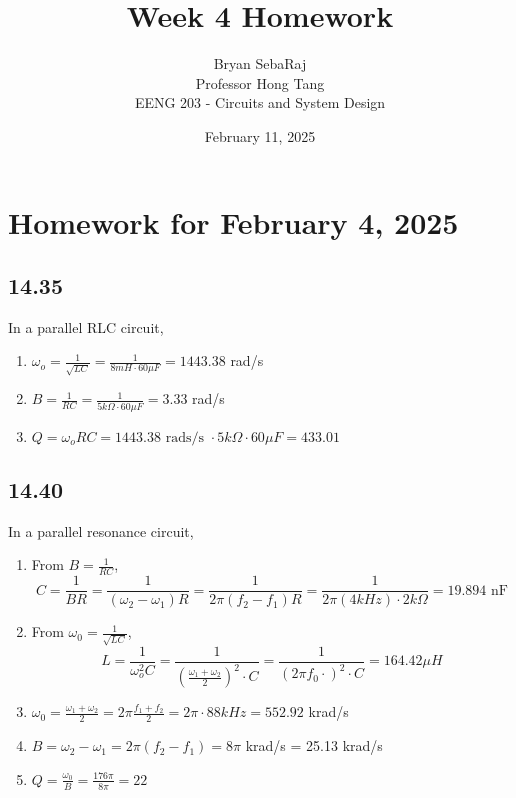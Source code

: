 \documentclass{article}
\title{Week 4 Homework}
\author{Bryan SebaRaj \\[0.7em] Professor Hong Tang \\[0.7em]  EENG 203 - Circuits and System Design}
\date{February 11, 2025}
\begin{document}
\maketitle

\section*{Homework for February 4, 2025}

\subsection*{14.35}

In a parallel RLC circuit,

\begin{enumerate}[label=(\alph*)]
    \item $\omega_o=\frac{1}{\sqrt{LC}}=\frac{1}{8 mH \cdot 60 \mu F}=1443.38$ rad/s
    \item $B=\frac{1}{RC}=\frac{1}{5 k\Omega \cdot 60 \mu F}=3.33$ rad/s
    \item $Q=\omega_oRC=1443.38 \text{ rads/s } \cdot 5 k\Omega \cdot 60 \mu F =  433.01$
\end{enumerate}

\subsection*{14.40}

In a parallel resonance circuit,

\begin{enumerate}[label=(\alph*)]
    \item From $B=\frac{1}{RC}$, $$C=\frac{1}{BR}=\frac{1}{(\omega_2-\omega_1)R}=\frac{1}{2\pi(f_2-f_1)R}=\frac{1}{2\pi(4 kHz) \cdot 2 k\Omega}=19.894 \text{ nF}$$
\item From $\omega_0=\frac{1}{\sqrt{LC}}$, $$L=\frac{1}{\omega^2_oC}=\frac{1}{\left( \frac{\omega_1+\omega_2}{2}\right)^2 \cdot C}=\frac{1}{\left( 2\pi f_0 \cdot \right)^2 \cdot C}=164.42 \mu H$$
\item $\omega_0=\frac{\omega_1+\omega_2}{2}=2\pi\frac{f_1+f_2}{2}=2\pi \cdot 88 kHz=552.92$ krad/s
\item $B=\omega_2-\omega_1= 2\pi (f_2-f_1)=8\pi$ krad/s = 25.13 krad/s
\item $Q=\frac{\omega_0}{B}=\frac{176\pi}{8\pi}=22$
\end{enumerate}
\end{document}
